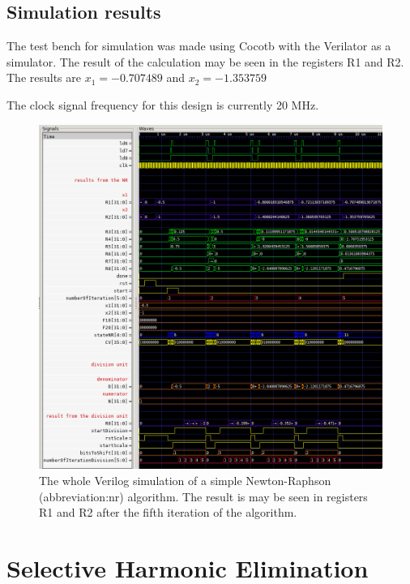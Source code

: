 \documentclass[a4paper, twoside, 11pt]{article}
\begin{document}
    \subsection{Simulation results}
        The test bench for simulation was made using Cocotb \cite{cocotb} with the Verilator \cite{verilator} as a simulator. The result of the calculation may be seen in the registers R1 and R2. The results are $x_1 = - 0.707489$ and $x_2 = - 1.353759$\par
        The clock signal frequency for this design is currently 20 MHz.
            \begin{figure}[htbp!]
                \centering
                \includegraphics[width=1\textwidth]{src/png/simple-nr-sim.png}
                \caption{The whole Verilog simulation of a simple Newton-Raphson (\gls{abbreviation:nr}) algorithm. The result is may be seen in registers R1 and R2 after the fifth iteration of the algorithm.}
                \label{fig:simple-nr-sim}
            \end{figure}



\section{Selective Harmonic Elimination}\label{sec:selective-harmonic-elimination}
\end{document}
